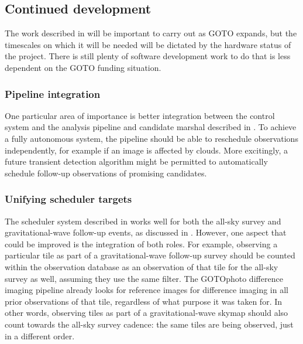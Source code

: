 \subsection{Continued development}
\label{sec:software_future}
\begin{colsection}

The work described in  will be important to carry out as GOTO expands, but the timescales on which it will be needed will be dictated by the hardware status of the project. There is still plenty of software development work to do that is less dependent on the GOTO funding situation.

\subsubsection{Pipeline integration}

One particular area of importance is better integration between the control system and the analysis pipeline and candidate marshal described in . To achieve a fully autonomous system, the pipeline should be able to reschedule observations independently, for example if an image is affected by clouds. More excitingly, a future transient detection algorithm might be permitted to automatically schedule follow-up observations of promising candidates.

\subsubsection{Unifying scheduler targets}

The scheduler system described in  works well for both the all-sky survey and gravitational-wave follow-up events, as discussed in . However, one aspect that could be improved is the integration of both roles. For example, observing a particular tile as part of a gravitational-wave follow-up survey should be counted within the observation database as an observation of that tile for the all-sky survey as well, assuming they use the same filter. The GOTOphoto difference imaging pipeline already looks for reference images for difference imaging in all prior observations of that tile, regardless of what purpose it was taken for. In other words, observing tiles as part of a gravitational-wave skymap should also count towards the all-sky survey cadence: the same tiles are being observed, just in a different order.

\newpage


\end{colsection}
